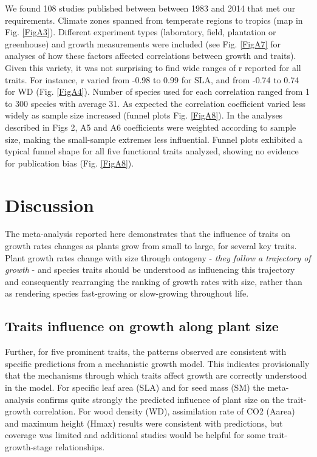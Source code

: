 \documentclass[a4paper]{article}\usepackage[]{graphicx}\usepackage[]{color}
\begin{document}
We found 108 studies published between between 1983 and 2014 that met our requirements. Climate zones spanned from temperate regions to  tropics (map in Fig. \ref{FigA3}). Different experiment types (laboratory, field, plantation or greenhouse) and growth measurements were included (see Fig. \ref{FigA7} for analyses of how these factors affected  correlations between growth and traits). Given this variety, it was not surprising to find wide ranges of r reported for all traits. For instance,  r varied from -0.98 to 0.99 for SLA, and from -0.74 to 0.74 for WD (Fig. \ref{FigA4}). Number of species used for each correlation ranged from 1 to 300 species with average  31. As expected the correlation coefficient varied less widely as sample size increased (funnel plots Fig. \ref{FigA8}). In the analyses described in Figs 2, A5 and A6 coefficients were weighted according to sample size, making the small-sample extremes less influential. Funnel plots exhibited a typical funnel shape for all five functional traits analyzed, showing no evidence for publication bias (Fig. \ref{FigA8}).


\section*{Discussion}\label{discussion}

The meta-analysis reported here demonstrates that the influence of traits on growth rates changes as plants grow from small to large, for several key traits. Plant growth rates change with size through ontogeny  \citep{Condit:1993hd, Clark:1999ed, Herault:2011dd} - \textit{they follow a trajectory of growth} - and species traits should be understood as influencing this trajectory and consequently rearranging the ranking of growth rates with size, rather than as rendering species fast-growing or slow-growing throughout life.

\subsection*{Traits influence on growth along plant size}

Further, for five prominent traits, the patterns observed are consistent with specific predictions from a mechanistic growth model. This indicates provisionally that the mechanisms through which traits affect growth are correctly understood in the model. For specific leaf area (SLA) and for seed mass (SM) the meta-analysis confirms quite strongly the predicted influence of plant size on the trait-growth correlation. For wood density (WD), assimilation rate of CO2 (Aarea) and maximum height (Hmax) results were consistent with predictions, but coverage was limited and additional studies would be helpful for some trait-growth-stage relationships.
\end{document}

